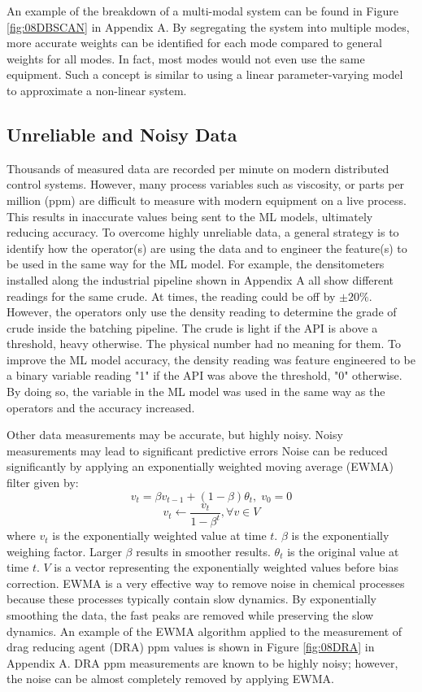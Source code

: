 An example of the breakdown of a multi-modal system can be found in Figure \ref{fig:08DBSCAN} in Appendix A.  By segregating the system into multiple modes, more accurate weights can be identified for each mode compared to general weights for all modes.  In fact, most modes would not even use the same equipment.  Such a concept is similar to using a linear parameter-varying model to approximate a non-linear system.  

\subsection{Unreliable and Noisy Data}
Thousands of measured data are recorded per minute on modern distributed control systems. However, many process variables such as viscosity, or parts per million (ppm) are difficult to measure with modern equipment on a live process. This results in inaccurate values being sent to the ML models, ultimately reducing accuracy.  To overcome highly unreliable data, a general strategy is to identify how the operator(s) are using the data and to engineer the feature(s) to be used in the same way for the ML model.  For example, the densitometers installed along the industrial pipeline shown in Appendix A all show different readings for the same crude. At times, the reading could be off by $\pm 20\%$. However, the operators only use the density reading to determine the grade of crude inside the batching pipeline. The crude is light if the API is above a threshold, heavy otherwise.  The physical number had no meaning for them.  To improve the ML model accuracy, the density reading was feature engineered to be a binary variable reading "1" if the API was above the threshold, "0" otherwise.  By doing so, the variable in the ML model was used in the same way as the operators and the accuracy increased.

Other data measurements may be accurate, but highly noisy. Noisy measurements may lead to significant predictive errors 
Noise can be reduced significantly by applying an exponentially weighted moving average (EWMA) filter given by:
\begin{equation}
    v_t = \beta v_{t - 1} + (1 - \beta) \theta_t, \; v_0 = 0
    \label{eq:08EWMA}
\end{equation}
\begin{equation}
    v_t \leftarrow \frac{v_t}{1 - \beta^t}, \forall v \in V
    \label{eq:08Bias_Correction}
\end{equation}
where $v_{t}$ is the exponentially weighted value at time $t$.  $\beta$ is the exponentially weighing factor.  Larger $\beta$ results in smoother results.  $\theta_t$ is the original value at time $t$. $V$ is a vector representing the exponentially weighted values before bias correction. EWMA is a very effective way to remove noise in chemical processes because these processes typically contain slow dynamics. By exponentially smoothing the data, the fast peaks are removed while preserving the slow dynamics. An example of the EWMA algorithm applied to the measurement of drag reducing agent (DRA) ppm values is shown in Figure \ref{fig:08DRA} in Appendix A.  DRA ppm measurements are known to be highly noisy; however, the noise can be almost completely removed by applying EWMA.


